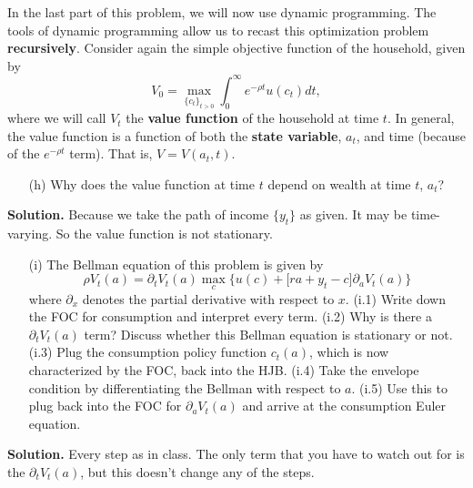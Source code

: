 \documentclass[11pt]{extarticle}
\theoremstyle{plain}
\theoremstyle{definition}
\begin{document}
\vspace{10mm}
\noindent
In the last part of this problem, we will now use dynamic programming. The tools of dynamic programming allow us to recast this optimization problem \textbf{recursively}. Consider again the simple objective function of the household, given by
\begin{equation*}
	V_0 = \max_{\{c_t\}_{t>0}} \int_0^\infty e^{-\rho t} u(c_t) dt,
\end{equation*}
where we will call $V_t$ the \textbf{value function} of the household at time $t$. In general, the value function is a function of both the \textbf{state variable}, $a_t$, and time (because of the $e^{-\rho t}$ term). That is, $V = V(a_t, t)$. 

\begin{enumerate}
	\item [(h)] Why does the value function at time $t$ depend on wealth at time $t$, $a_t$? 
\end{enumerate}


\vspace{5mm}
\noindent
\textbf{Solution.} Because we take the path of income $\{ y_t \}$ as given. It may be time-varying. So the value function is not stationary. 


\begin{enumerate}
	\item [(i)] The Bellman equation of this problem is given by
	\begin{equation*}
		\rho V_t(a) = \partial_t V_t(a) \max_c \bigg\{ u(c) + \Big[ ra + y_t - c \Big] \partial_a V_t(a) \bigg\}
	\end{equation*}
	where $\partial_x$ denotes the partial derivative with respect to $x$. (i.1) Write down the FOC for consumption and interpret every term. (i.2) Why is there a $\partial_t V_t(a)$ term? Discuss whether this Bellman equation is stationary or not. (i.3) Plug the consumption policy function $c_t(a)$, which is now characterized by the FOC, back into the HJB. (i.4) Take the envelope condition by differentiating the Bellman with respect to $a$. (i.5) Use this to plug back into the FOC for $\partial_a V_t(a)$ and arrive at the consumption Euler equation.
\end{enumerate}

\vspace{5mm}
\noindent
\textbf{Solution.} Every step as in class. The only term that you have to watch out for is the $\partial_t V_t(a)$, but this doesn't change any of the steps. 
\end{document}
